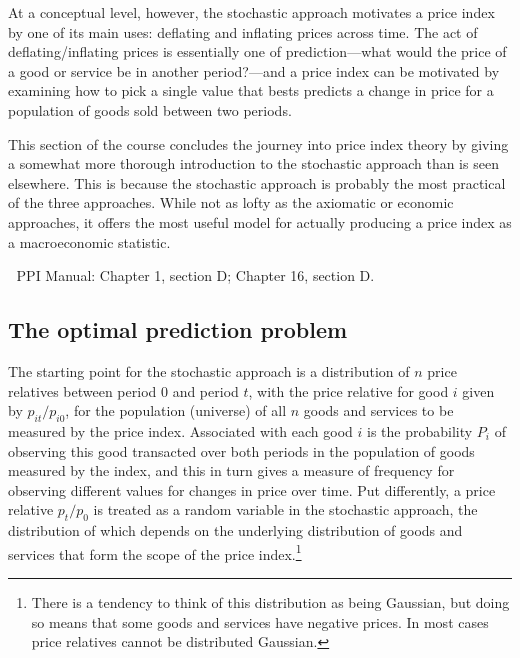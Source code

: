 \documentclass[
]{article}
\begin{document}
At a conceptual level, however, the stochastic approach motivates a price index by one of its main uses: deflating and inflating prices across time. The act of deflating/inflating prices is essentially one of prediction---what would the price of a good or service be in another period?---and a price index can be motivated by examining how to pick a single value that bests predicts a change in price for a population of goods sold between two periods.

This section of the course concludes the journey into price index theory by giving a somewhat more thorough introduction to the stochastic approach than is seen elsewhere. This is because the stochastic approach is probably the most practical of the three approaches. While not as lofty as the axiomatic or economic approaches, it offers the most useful model for actually producing a price index as a macroeconomic statistic.

📖 PPI Manual: Chapter 1, section D; Chapter 16, section D.

\hypertarget{the-optimal-prediction-problem}{%
\subsection{The optimal prediction problem}\label{the-optimal-prediction-problem}}

The starting point for the stochastic approach is a distribution of \(n\) price relatives between period 0 and period \(t\), with the price relative for good \(i\) given by \(p_{it} / p_{i0}\), for the population (universe) of all \(n\) goods and services to be measured by the price index. Associated with each good \(i\) is the probability \(P_{i}\) of observing this good transacted over both periods in the population of goods measured by the index, and this in turn gives a measure of frequency for observing different values for changes in price over time. Put differently, a price relative \(p_{t} / p_{0}\) is treated as a random variable in the stochastic approach, the distribution of which depends on the underlying distribution of goods and services that form the scope of the price index.\footnote{There is a tendency to think of this distribution as being Gaussian, but doing so means that some goods and services have negative prices. In most cases price relatives cannot be distributed Gaussian.}
\end{document}

